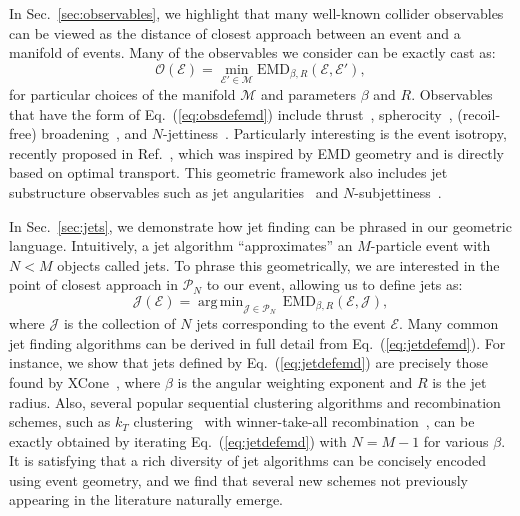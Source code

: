 \documentclass[letterpaper,11pt]{article}
\DeclareMathOperator*{\argmin}{arg\,min}
\newcommand{\E}{\mathcal{E}}
\renewcommand{\O}{\mathcal{O}}
\DeclareRobustCommand{\Sec}[1]{Sec.~\ref{#1}}
\DeclareRobustCommand{\Eq}[1]{Eq.~(\ref{#1})}
\DeclareRobustCommand{\Ref}[1]{Ref.~\cite{#1}}
\newcommand{\EMD}{\text{EMD}\xspace}
\begin{document}
In \Sec{sec:observables}, we highlight that many well-known collider observables can be viewed as the distance of closest approach between an event and a manifold of events.
%
Many of the observables we consider can be exactly cast as:
%
\begin{equation}
\label{eq:obsdefemd}
\O(\E) = \min_{\E'\in\mathcal M}\EMD_{\beta,R}(\E,\E'),
\end{equation}
%
for particular choices of the manifold $\mathcal M$ and parameters $\beta$ and $R$.
%
Observables that have the form of \Eq{eq:obsdefemd} include thrust~\cite{Brandt:1964sa,Farhi:1977sg}, spherocity~\cite{Georgi:1977sf}, (recoil-free) broadening~\cite{Larkoski:2014uqa}, and $N$-jettiness~\cite{Stewart:2010tn}.
%
Particularly interesting is the event isotropy, recently proposed in \Ref{isotropytemp}, which was inspired by EMD geometry and is directly based on optimal transport.
%
This geometric framework also includes jet substructure observables such as jet angularities~\cite{Ellis:2010rwa} and  $N$-subjettiness~\cite{Thaler:2010tr,Thaler:2011gf}.



In \Sec{sec:jets}, we demonstrate how jet finding can be phrased in our geometric language.
%
Intuitively, a jet algorithm ``approximates'' an $M$-particle event with $N<M$ objects called jets.
%
To phrase this geometrically, we are interested in the point of closest approach in $\mathcal P_N$ to our event, allowing us to define jets as:
%
\begin{equation}
\label{eq:jetdefemd}
\mathcal J(\E)=\argmin_{\mathcal J\in\mathcal P_N}\,\EMD_{\beta,R}(\E,\mathcal J),
\end{equation}
%
where $\mathcal J$ is the collection of $N$ jets corresponding to the event $\E$.
%
Many common jet finding algorithms can be derived in full detail from \Eq{eq:jetdefemd}.
%
For instance, we show that jets defined by \Eq{eq:jetdefemd} are precisely those found by XCone~\cite{Stewart:2015waa,Thaler:2015xaa}, where $\beta$ is the angular weighting exponent and $R$ is the jet radius.
%
Also, several popular sequential clustering algorithms and recombination schemes, such as $k_T$ clustering~\cite{Catani:1993hr,Ellis:1993tq} with winner-take-all recombination~\cite{Bertolini:2013iqa,Larkoski:2014uqa,Salambroadening}, can be exactly obtained by iterating \Eq{eq:jetdefemd} with $N = M-1$ for various $\beta$.
%
It is satisfying that a rich diversity of jet algorithms can be concisely encoded using event geometry, and we find that several new schemes not previously appearing in the literature naturally emerge.
\end{document}
